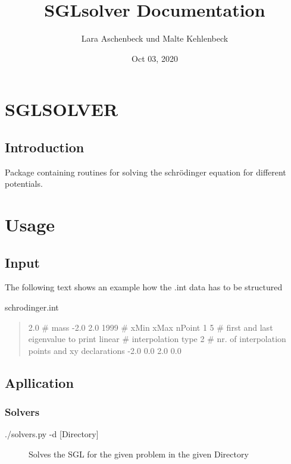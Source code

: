 \documentclass[letterpaper,10pt,english]{sphinxmanual}
\title{SGLsolver Documentation}
\date{Oct 03, 2020}
\author{Lara Aschenbeck und Malte Kehlenbeck}
\begin{document}
\pagestyle{empty}
\sphinxmaketitle
\pagestyle{plain}
\sphinxtableofcontents
\pagestyle{normal}
\label{\detokenize{index::doc}}



\chapter{SGLSOLVER}
\label{\detokenize{README:sglsolver}}\label{\detokenize{README::doc}}

\section{Introduction}
\label{\detokenize{README:introduction}}
Package containing routines for solving the schrödinger equation for
different potentials.


\chapter{Usage}
\label{\detokenize{README:usage}}

\section{Input}
\label{\detokenize{README:input}}
The following text shows an example how the .int data has to be structured

schrodinger.int
\begin{quote}

2.0 \# mass
-2.0 2.0 1999 \# xMin xMax nPoint
1 5 \# first and last eigenvalue to print
linear \# interpolation type
2 \# nr. of interpolation points and xy declarations
-2.0 0.0
2.0 0.0
\end{quote}


\section{Apllication}
\label{\detokenize{README:apllication}}

\subsection{Solvers}
\label{\detokenize{README:solvers}}\begin{description}
\item[{./solvers.py -d {[}Directory{]}}] \leavevmode
Solves the SGL for the given problem in the given Directory

\end{description}
\end{document}
